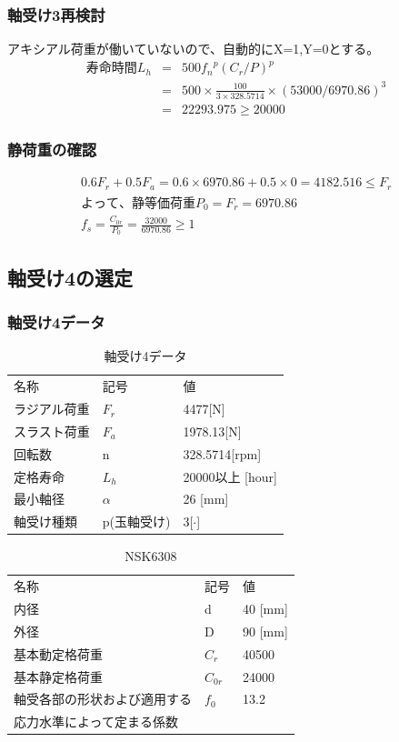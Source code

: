 \documentclass[a4j,twoside,openright,11pt]{jreport}
\begin{document}
\subsubsection{軸受け3再検討}
アキシアル荷重が働いていないので、自動的にX=1,Y=0とする。
\begin{eqnarray}
寿命時間L_h &=& 500{f_n}^p(C_r/P)^p\\
           &=& 500 \times \frac{100}{3 \times 328.5714} \times (53000/6970.86)^3\\
           &=& 22293.975 \geq 20000
\end{eqnarray}

\subsubsection{静荷重の確認}
\begin{eqnarray}
0.6F_r+0.5F_a=0.6 \times 6970.86 + 0.5 \times 0 = 4182.516 \leq F_r\\
よって、静等価荷重P_0 = F_r = 6970.86\\
f_s = \frac{C_{0r}}{P_0} = \frac{32000}{6970.86} \geq 1
\end{eqnarray}

\newpage
\subsection{軸受け4の選定}
\subsubsection{軸受け4データ}
\begin{table}[htb]
\begin{center}
  \caption{軸受け4データ}
  \begin{tabular}{lll} \hline
名称&記号&値\\
ラジアル荷重&$F_r$&4477[N]\\
スラスト荷重&$F_a$&1978.13[N]\\
回転数&n&328.5714[rpm]\\
定格寿命&$L_h$&20000以上 [hour]\\
最小軸径&$\alpha$&26 [mm]\\
軸受け種類&p(玉軸受け)&3[$\cdot$]\\
\hline
  \end{tabular}
\end{center}
\end{table}

\begin{table}[htb]
\begin{center}
  \caption{NSK6308}
  \begin{tabular}{lll} \hline
名称&記号&値\\
内径& d &40 [mm]\\
外径& D &90 [mm]\\
基本動定格荷重&$C_{r}$&40500\\
基本静定格荷重&$C_{0r}$&24000\\
軸受各部の形状および適用する&$f_0$&13.2\\
応力水準によって定まる係数&&\\
\hline
  \end{tabular}
\end{center}
\end{table}
\end{document}
